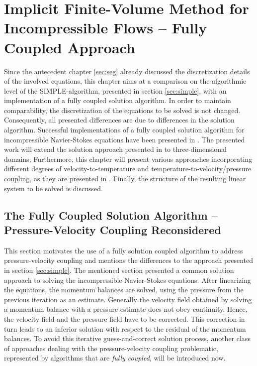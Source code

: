 \chapter{Implicit Finite-Volume Method for Incompressible Flows -- Fully Coupled Approach}
\label{sec:cpld}

Since the antecedent chapter \ref{sec:seg} already discussed the discretization details of the involved equations, this chapter aims at a comparison on the algorithmic level of the SIMPLE-algorithm, presented in section \ref{sec:simple}, with an implementation of a fully coupled solution algorithm. In order to maintain comparability, the discretization of the equations to be solved is not changed. Consequently, all presented differences are due to differences in the solution algorithm. Successful implementations of a fully coupled solution algorithm for incompressible Navier-Stokes equations have been presented in \cite{chen10,darwish09,falk13,vakilipour12}. The presented work will extend the solution approach presented in \cite{falk13} to three-dimensional domains. Furthermore, this chapter will present various approaches incorporating different degrees of velocity-to-temperature and temperature-to-velocity/pressure coupling, as they are presented in \cite{galpin86,vakilipour12}. Finally, the structure of the resulting linear system to be solved is discussed.

\section{The Fully Coupled Solution Algorithm -- Pressure-Velocity Coupling Reconsidered}
\label{sec:reconsider}

This section motivates the use of a fully solution coupled algorithm to address pressure-velocity coupling and mentions the differences to the approach presented in section \ref{sec:simple}. The mentioned section presented a common solution approach to solving the incompressible Navier-Stokes equations. After linearizing the equations, the momentum balances are solved, using the pressure from the previous iteration as an estimate. Generally the velocity field obtained by solving a momentum balance with a pressure estimate does not obey continuity. Hence, the velocity field and the pressure field have to be corrected. This correction in turn leads to an inferior solution with respect to the residual of the momentum balances. To avoid this iterative guess-and-correct solution process, another class of approaches dealing with the pressure-velocity coupling problematic, represented by algorithms that are \emph{fully coupled}, will be introduced now.

